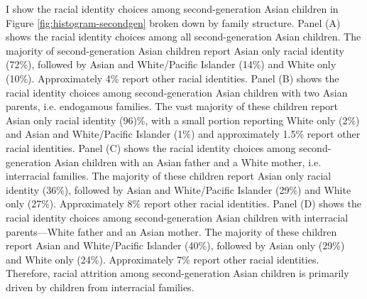 I show the racial identity choices among second-generation Asian children in Figure \ref{fig:histogram-secondgen} broken down by family structure. Panel (A) shows the racial identity choices among all second-generation Asian children. The majority of second-generation Asian children report Asian only racial identity (72\%), followed by Asian and White/Pacific Islander (14\%) and White only (10\%). Approximately 4\% report other racial identities. Panel (B) shows the racial identity choices among second-generation Asian children with two Asian parents, i.e. endogamous families. The vast majority of these children report Asian only racial identity (96)\%, with a small portion reporting White only (2\%) and Asian and White/Pacific Islander (1\%) and approximately 1.5\% report other racial identities. Panel (C) shows the racial identity choices among second-generation Asian children with an Asian father and a White mother, i.e. interracial families. The majority of these children report Asian only racial identity (36\%), followed by Asian and White/Pacific Islander (29\%) and White only (27\%). Approximately 8\% report other racial identities. Panel (D) shows the racial identity choices among second-generation Asian children with interracial parents---White father and an Asian mother. The majority of these children report Asian and White/Pacific Islander (40\%), followed by Asian only (29\%) and White only (24\%). Approximately 7\% report other racial identities. Therefore, racial attrition among second-generation Asian children is primarily driven by children from interracial families.

